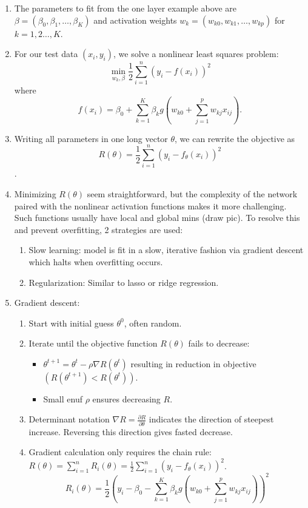 \documentclass{article}
\begin{document}
\begin{enumerate}
\item The parameters to fit from the one layer example above are $\beta = (\beta_0, \beta_1, \dots, \beta_K)$ and activation weights $w_k = (w_{k0}, w_{k1}, \dots, w_{kp})$ for $k=1,2\dots,K$. 
\item For our test data $(x_i, y_i)$, we solve a nonlinear least squares problem:
\[
\min_{w_k, \beta} \frac{1}{2} \sum_{i=1}^n (y_i - f(x_i))^2
\]
where
\[
f(x_i) = \beta_0 + \sum_{k=1}^K \beta_k g\left(w_{k0} + \sum_{j=1}^p w_{kj} x_{ij} \right).
\]
\item Writing all parameters in one long vector $\theta$, we can rewrite the objective as 
\[
R(\theta) = \frac{1}{2} \sum_{i=1}^n (y_i - f_{\theta}(x_i))^2
\].
\item Minimizing $R(\theta)$ seem straightforward, but the complexity of the network paired with the nonlinear activation functions makes it more challenging. Such functions usually have local and global mins (draw pic). To resolve this and prevent overfitting, 2 strategies are used:
\begin{enumerate}
\item Slow learning: model is fit in a slow, iterative fashion via gradient descent which halts when overfitting occurs.
\item Regularization: Similar to lasso or ridge regression.
\end{enumerate}
\item Gradient descent:
\begin{enumerate}
\item Start with initial guess $\theta^0$, often random.
\item Iterate until the objective function $R(\theta)$ fails to decrease:
\begin{itemize}
\item $\theta^{t+1} = \theta^t - \rho \nabla R(\theta^t)$ resulting in reduction in objective $(R(\theta^{t+1})<R(\theta^t))$.
\item Small enuf $\rho$ ensures decreasing $R$. 
\end{itemize}
\item Determinant notation $\nabla R = \frac{\partial R}{\partial \theta}$ indicates the direction of steepest increase. Reversing this direction gives fasted decrease.
\item Gradient calculation only requires the chain rule: $R(\theta) = \sum_{i=1}^n R_i (\theta) = \frac{1}{2} \sum_{i=1}^n (y_i - f_{\theta}(x_i))^2$.
\[
R_i(\theta) = \frac{1}{2} \left( y_i - \beta_0 - \sum_{k=1}^K \beta_k g(w_{k0}+\sum_{j=1}^p w_{kj} x_{ij}) \right)^2
\]
\end{enumerate}
\end{enumerate}
\end{document}
